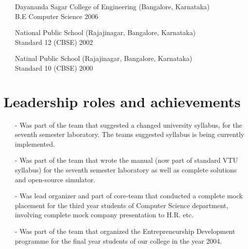 \documentclass[a4paper,12pt]{article}
\begin{document}
\begin{itemize}
\item[] Dayananda Sagar College of Engineering (Bangalore,
  Karnataka)\\ B.E Computer Science \hfill 2006
\item[] National Public School (Rajajinagar, Bangalore,
  Karnataka)\\ Standard 12 (CBSE) \hfill 2002
\item[] Natinal Public School (Rajajinagar, Bangalore,
  Karnataka)\\ Standard 10 (CBSE) \hfill 2000
\end{itemize}

\section{Leadership roles and achievements}

\begin{itemize}

\item[-] Was part of the team that suggested a changed university syllabus, for the seventh semester laboratory. The teams suggested syllabus is being currently implemented.
\item[-] Was part of the team that wrote the manual (now part of
  standard VTU syllabus) for the seventh
  semester laboratory as well as complete solutions and open-source
  simulator.
\item[-] Was lead organizer and part of core-team that conducted a complete mock placement for the third year students of Computer Science department, involving complete mock company presentation to H.R. etc.
\item[-] Was part of the team that organized the Entrepreneurship Development programme for the final year students of our college in the year 2004.
\end{itemize}
\end{document}
